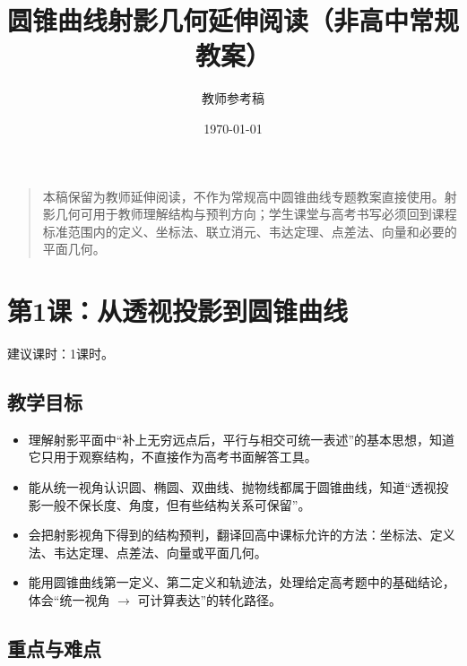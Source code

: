 \documentclass[UTF8,a4paper,11pt]{ctexart}
\title{圆锥曲线射影几何延伸阅读（非高中常规教案）}
\author{教师参考稿}
\date{\today}
\begin{document}
\maketitle

\begin{quote}

本稿保留为教师延伸阅读，不作为常规高中圆锥曲线专题教案直接使用。射影几何可用于教师理解结构与预判方向；学生课堂与高考书写必须回到课程标准范围内的定义、坐标法、联立消元、韦达定理、点差法、向量和必要的平面几何。

\end{quote}

\tableofcontents

\clearpage

\section{第1课：从透视投影到圆锥曲线}

\noindent 建议课时：1课时。

\subsection*{教学目标}

\begin{itemize}

\item 理解射影平面中“补上无穷远点后，平行与相交可统一表述”的基本思想，知道它只用于观察结构，不直接作为高考书面解答工具。

\item 能从统一视角认识圆、椭圆、双曲线、抛物线都属于圆锥曲线，知道“透视投影一般不保长度、角度，但有些结构关系可保留”。

\item 会把射影视角下得到的结构预判，翻译回高中课标允许的方法：坐标法、定义法、韦达定理、点差法、向量或平面几何。

\item 能用圆锥曲线第一定义、第二定义和轨迹法，处理给定高考题中的基础结论，体会“统一视角 $\to$ 可计算表达”的转化路径。

\end{itemize}

\subsection*{重点与难点}
\end{document}

